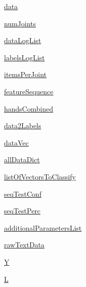 \begin{DoxyCompactItemize}
\item 
\hyperlink{group__icubclient__SAM__Drivers_a56b2437f3700afce6363dd8510f6661b}{data}
\item 
\hyperlink{group__icubclient__SAM__Drivers_ab90cebf00ada98f96102c2b01b2ff970}{num\+Joints}
\item 
\hyperlink{group__icubclient__SAM__Drivers_a0795d275820675450a4ccc869e759958}{data\+Log\+List}
\item 
\hyperlink{group__icubclient__SAM__Drivers_a3d24d506bc292c1f8f53ebd903e6f0e3}{labels\+Log\+List}
\item 
\hyperlink{group__icubclient__SAM__Drivers_a9bca50058da592720fd710d2d6e3e1ec}{items\+Per\+Joint}
\item 
\hyperlink{group__icubclient__SAM__Drivers_accf604f68241cf3847a9f5d695710330}{feature\+Sequence}
\item 
\hyperlink{group__icubclient__SAM__Drivers_aa99dc23f32bb97a5dc615764f3812248}{hands\+Combined}
\item 
\hyperlink{group__icubclient__SAM__Drivers_ad9c274bfb069dd815c35b46d77bca9d1}{data2\+Labels}
\item 
\hyperlink{group__icubclient__SAM__Drivers_a405e35ae705be4102f3e7cb2394f055f}{data\+Vec}
\item 
\hyperlink{group__icubclient__SAM__Drivers_a2c4032e4052b59a249bae791ee6a4ae8}{all\+Data\+Dict}
\item 
\hyperlink{group__icubclient__SAM__Drivers_a59f13ac648de32dde07f5b18c1e78a56}{list\+Of\+Vectors\+To\+Classify}
\item 
\hyperlink{group__icubclient__SAM__Drivers_a0dab1e97a70d82f72fe076df29b0e052}{seq\+Test\+Conf}
\item 
\hyperlink{group__icubclient__SAM__Drivers_a8d905b932fffa96aeeb19f121c225d66}{seq\+Test\+Perc}
\item 
\hyperlink{group__icubclient__SAM__Drivers_ad699eb08f48f023fb5e0c744c9a4051e}{additional\+Parameters\+List}
\item 
\hyperlink{group__icubclient__SAM__Drivers_ae0bdb001bbc956edc2bb1e8f5f1e3093}{raw\+Text\+Data}
\item 
\hyperlink{group__icubclient__SAM__Drivers_ab531558eee10a99547032f611799fc2e}{Y}
\item 
\hyperlink{group__icubclient__SAM__Drivers_a794184bc22c039821402946663a2fe5b}{L}
\end{DoxyCompactItemize}


